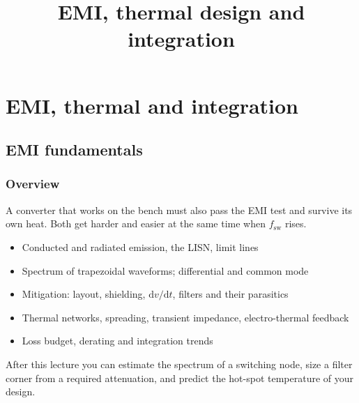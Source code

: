 \title[EMI, thermal design and integration]{EMI, thermal design and integration}
\section{EMI, thermal and integration}

\begin{frame}[plain]
	\titlepage
\end{frame}

\subsection{EMI fundamentals}

\begin{frame}
	\frametitle{Overview}
	A converter that works on the bench must also pass the EMI test and survive its own heat. Both get harder and easier at the same time when $f_\mathrm{sw}$ rises.
	\begin{itemize}
		\item Conducted and radiated emission, the LISN, limit lines
		\item Spectrum of trapezoidal waveforms; differential and common mode
		\item Mitigation: layout, shielding, $\mathrm{d}v/\mathrm{d}t$, filters and their parasitics
		\item Thermal networks, spreading, transient impedance, electro-thermal feedback
		\item Loss budget, derating and integration trends
	\end{itemize}
	After this lecture you can estimate the spectrum of a switching node, size a filter corner from a required attenuation, and predict the hot-spot temperature of your design.
\end{frame}

